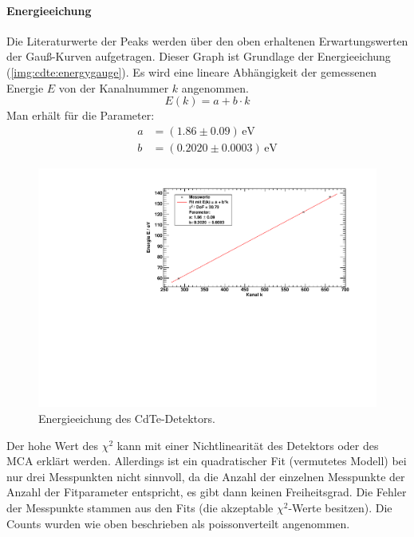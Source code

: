 \paragraph{Energieeichung}
Die Literaturwerte der Peaks werden über den oben erhaltenen Erwartungswerten der Gauß-Kurven aufgetragen. Dieser Graph ist Grundlage der 
Energieeichung (\autoref{img:cdte:energygauge}). Es wird eine lineare Abhängigkeit der gemessenen Energie $E$ von der Kanalnummer $k$ angenommen.
\begin{equation}
  E(k) = a + b \cdot k
\end{equation}
Man erhält für die Parameter:
\begin{equation}
\begin{split}
  a &= (1.86 \pm 0.09)\,\text{eV} \\
  b &= (0.2020 \pm 0.0003)\,\text{eV}
\end{split}
\end{equation}
\begin{figure}[H]
\begin{center}
  \includegraphics[width=\textwidth]{../img/part3/energygauge_CdTe.pdf}
  \caption{Energieeichung des CdTe-Detektors.}
  \label{img:cdte:energygauge}
\end{center}
\end{figure}
Der hohe Wert des $\chi^2$ kann mit einer Nichtlinearität des Detektors oder des MCA erklärt werden. Allerdings ist ein quadratischer Fit 
(vermutetes Modell) bei nur drei Messpunkten nicht sinnvoll, da die Anzahl der einzelnen Messpunkte der Anzahl der Fitparameter entspricht, es 
gibt dann keinen Freiheitsgrad.
Die Fehler der Messpunkte stammen aus den Fits (die akzeptable $\chi^2$-Werte besitzen). Die Counts 
wurden wie oben beschrieben als poissonverteilt angenommen.

